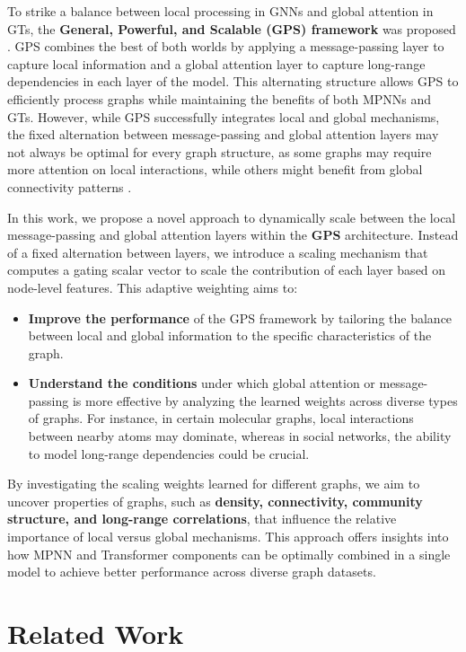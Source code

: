 \documentclass{acmart}
\begin{document}
To strike a balance between local processing in GNNs and global attention in GTs, the \textbf{General, Powerful, and Scalable (GPS) framework} was proposed \cite{rampášek2023recipegeneralpowerfulscalable}. GPS combines the best of both worlds by applying a message-passing layer to capture local information and a global attention layer to capture long-range dependencies in each layer of the model. This alternating structure allows GPS to efficiently process graphs while maintaining the benefits of both MPNNs and GTs. However, while GPS successfully integrates local and global mechanisms, the fixed alternation between message-passing and global attention layers may not always be optimal for every graph structure, as some graphs may require more attention on local interactions, while others might benefit from global connectivity patterns \cite{Bronstein_2017}.

In this work, we propose a novel approach to dynamically scale between the local message-passing and global attention layers within the \textbf{GPS} architecture. Instead of a fixed alternation between layers, we introduce a scaling mechanism that computes a gating scalar vector to scale the contribution of each layer based on node-level features. This adaptive weighting aims to:

\begin{itemize}
    \item \textbf{Improve the performance} of the GPS framework by tailoring the balance between local and global information to the specific characteristics of the graph.
    \item \textbf{Understand the conditions} under which global attention or message-passing is more effective by analyzing the learned weights across diverse types of graphs. For instance, in certain molecular graphs, local interactions between nearby atoms may dominate, whereas in social networks, the ability to model long-range dependencies could be crucial.
\end{itemize}

By investigating the scaling weights learned for different graphs, we aim to uncover properties of graphs, such as \textbf{density, connectivity, community structure, and long-range correlations}, that influence the relative importance of local versus global mechanisms. This approach offers insights into how MPNN and Transformer components can be optimally combined in a single model to achieve better performance across diverse graph datasets.

\section{Related Work}
\end{document}
